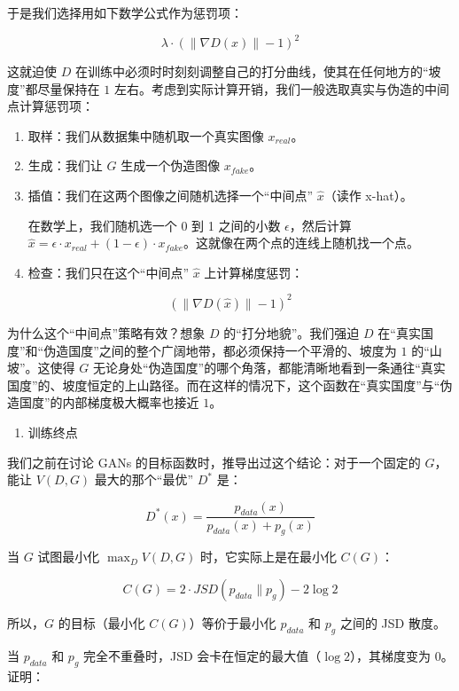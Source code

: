 于是我们选择用如下数学公式作为惩罚项：

\[
\lambda \cdot (\lVert \nabla D(x) \rVert - 1)^2
\]

这就迫使 \(D\) 在训练中必须时时刻刻调整自己的打分曲线，使其在任何地方的``坡度''都尽量保持在 \(1\) 左右。考虑到实际计算开销，我们一般选取真实与伪造的中间点计算惩罚项：

\begin{enumerate}
\def\labelenumi{\arabic{enumi}.}
\item
  取样：我们从数据集中随机取一个真实图像 \(x_{real}\)。
\item
  生成：我们让 \(G\) 生成一个伪造图像 \(x_{fake}\)。
\item
  插值：我们在这两个图像之间随机选择一个``中间点'' \(\hat{x}\)（读作 x-hat）。

  在数学上，我们随机选一个 0 到 1 之间的小数 \(\epsilon\)，然后计算 \(\hat{x}=\epsilon\cdot x_{real}+(1-\epsilon)\cdot x_{fake}\)。这就像在两个点的连线上随机找一个点。
\item
  检查：我们只在这个``中间点'' \(\hat{x}\) 上计算梯度惩罚：
\end{enumerate}

\[
(\lVert \nabla D(\hat{x}) \rVert - 1)^2
\]

为什么这个``中间点''策略有效？想象 \(D\) 的``打分地貌''。我们强迫 \(D\) 在``真实国度''和``伪造国度''之间的整个广阔地带，都必须保持一个平滑的、坡度为 \(1\) 的``山坡''。这使得 \(G\) 无论身处``伪造国度''的哪个角落，都能清晰地看到一条通往``真实国度''的、坡度恒定的上山路径。而在这样的情况下，这个函数在``真实国度''与``伪造国度''的内部梯度极大概率也接近 \(1\)。

\begin{enumerate}
\def\labelenumi{\arabic{enumi}.}
\setcounter{enumi}{2}
\tightlist
\item
  训练终点
\end{enumerate}

我们之前在讨论 GANs 的目标函数时，推导出过这个结论：对于一个固定的 \(G\)，能让 \(V(D,G)\) 最大的那个``最优'' \(D^*\) 是：

\[
D^*(x)=\frac{p_{data}(x)}{p_{data}(x)+p_g(x)}
\]

当 \(G\) 试图最小化 \(\max_D V(D,G)\) 时，它实际上是在最小化 \(C(G)\)：

\[
C(G)=2\cdot JSD(p_{data}\parallel p_g)-2\log 2
\]

所以，\(G\) 的目标（最小化 \(C(G)\)）等价于最小化 \(p_{data}\) 和 \(p_g\) 之间的 JSD 散度。

当 \(p_{data}\) 和 \(p_g\) 完全不重叠时，JSD 会卡在恒定的最大值（\(\log 2\)），其梯度变为 \(0\)。证明：

